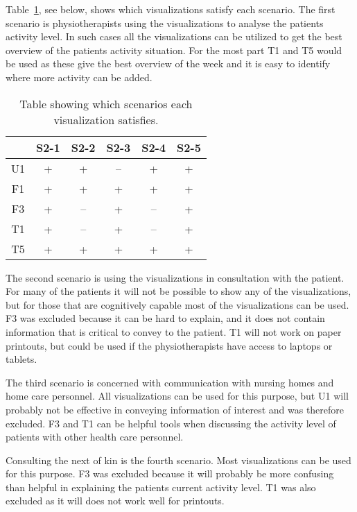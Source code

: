Table~\ref{tab:scenSet}, see below, shows which visualizations satisfy each scenario. The first scenario is physiotherapists using the visualizations to analyse the patients activity level. In such cases all the visualizations can be utilized to get the best overview of the patients activity situation. For the most part T1 and T5 would be used as these give the best overview of the week and it is easy to identify where more activity can be added. 

\begin{table}[h!]
  \centering
  \begin{tabular}{|c|c|c|c|c|c|}
    \hline
       & S2-1 & S2-2 & S2-3 & S2-4 & S2-5 \\ \hline
    U1 & +  & +  & -- & +  & +  \\ \hline
    F1 & +  & +  & +  & +  & +  \\ \hline
    F3 & +  & -- & +  & -- & +  \\ \hline
    T1 & +  & -- & +  & -- & +  \\ \hline
    T5 & +  & +  & +  & +  & +  \\ \hline
  \end{tabular}
  \caption[Scenarios and visualizations]{Table showing which scenarios each visualization satisfies.}
  \label{tab:scenSet}
\end{table}

The second scenario is using the visualizations in consultation with the patient. For many of the patients it will not be possible to show any of the visualizations, but for those that are cognitively capable most of the visualizations can be used. F3 was excluded because it can be hard to explain, and it does not contain information that is critical to convey to the patient. T1 will not work on paper printouts, but could be used if the physiotherapists have access to laptops or tablets.

The third scenario is concerned with communication with nursing homes and home care personnel. All visualizations can be used for this purpose, but U1 will probably not be effective in conveying information of interest and was therefore excluded. F3 and T1 can be helpful tools when discussing the activity level of patients with other health care personnel.

Consulting the next of kin is the fourth scenario. Most visualizations can be used for this purpose. F3 was excluded because it will probably be more confusing than helpful in explaining the patients current activity level. T1 was also excluded as it will does not work well for printouts.

